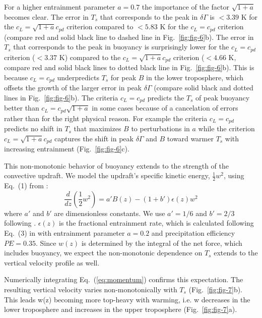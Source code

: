 \documentclass[draft]{ametsocV6.1}
\begin{document}
For a higher entrainment parameter $a=0.7$ the importance of the factor $\sqrt{1+a}$ becomes clear. The error in $T_s$ that corresponds to the peak in $\delta \Gamma$ is $<3.39$ K for the $c_L=\sqrt{1+a}c_{pd}$ criterion compared to $<5.83$ K for the $c_L=c_{pd}$ criterion (compare red and solid black line to dashed line in Fig.~\ref{fig:fig-6}b). The error in $T_s$ that corresponds to the peak in buoyancy is surprisingly lower for the $c_L=c_{pd}$ criterion ($<3.37$ K) compared to the $c_L=\sqrt{1+a}c_{pd}$ criterion ($<4.66$ K, compare red and solid black lines to dotted black line in Fig.~\ref{fig:fig-6}b). This is because $c_L=c_{pd}$ underpredicts $T_s$ for peak $B$ in the lower troposphere, which offsets the growth of the larger error in peak $\delta \Gamma$ (compare solid black and dotted lines in Fig.~\ref{fig:fig-6}b). The criteria $c_L=c_{pd}$ predicts the $T_s$ of peak buoyancy better than $c_L=c_{pd}\sqrt{1+a}$ in some cases because of a cancelation of errors rather than for the right physical reason. For example the criteria $c_L=c_{pd}$ predicts no shift in $T_s$ that maximizes $B$ to perturbations in $a$ while the criterion $c_L=\sqrt{1+a}c_{pd}$ captures the shift in peak $\delta \Gamma$ and $B$ toward warmer $T_s$ with increasing entrainment (Fig.~\ref{fig:fig-6}c).

This non-monotonic behavior of buoyancy extends to the strength of the convective updraft. We model the updraft's specific kinetic energy, $\frac{1}{2}w^2$, using Eq.~(1) from \cite{delgenio2007}:
\begin{equation}
\frac{d}{dz}\left(\frac{1}{2}w^2\right)=a'B(z)-(1+b')\epsilon(z)w^2 \label{eq:momentum}
\end{equation}
where $a'$ and $b'$ are dimensionless constants. We use $a'=1/6$ and $b'=2/3$ following \cite{delgenio2007}. $\epsilon(z)$ is the fractional entrainment rate, which is calculated following Eq.~(3) in \cite{romps2016} with entrainment parameter $a=0.2$ and precipitation efficiency $PE=0.35$. Since $w(z)$ is determined by the integral of the net force, which includes buoyancy, we expect the non-monotonic dependence on $T_s$ extends to the vertical velocity profile as well.

Numerically integrating Eq.~(\ref{eq:momentum}) confirms this expectation. The resulting vertical velocity varies non-monotonically with $T_s$ (Fig.~\ref{fig:fig-7}b). This leads w(z) becoming more top-heavy with warming, i.e. w decreases in the lower troposphere and increases in the upper troposphere (Fig.~\ref{fig:fig-7}a).
\end{document}
